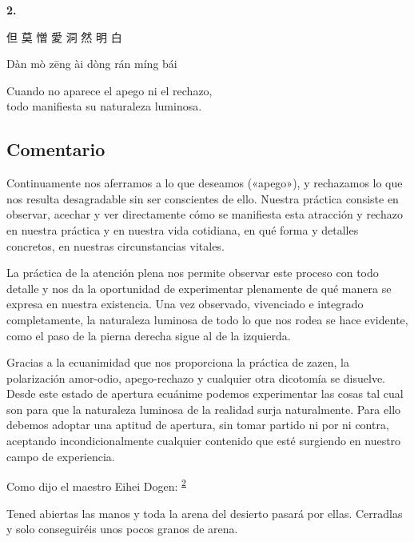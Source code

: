 \documentclass[
  a5paperpaper,
]{article}
\begin{document}
\hfill\break

\hypertarget{02}{}
\begin{verseblock}

\newpage

\begin{center}\textbf{2.}\end{center}

但 莫 憎 愛 洞 然 明 白

Dàn mò zēng ài dòng rán míng bái

Cuando no aparece el apego ni el rechazo,\\
todo manifiesta su naturaleza luminosa.

\end{verseblock}

\hfill\break

\hypertarget{comentario-1}{%
\subsection{Comentario}\label{comentario-1}}

Continuamente nos aferramos a lo que deseamos («apego»), y rechazamos lo
que nos resulta desagradable sin ser conscientes de ello. Nuestra
práctica consiste en observar, acechar y ver directamente cómo se
manifiesta esta atracción y rechazo en nuestra práctica y en nuestra
vida cotidiana, en qué forma y detalles concretos, en nuestras
circunstancias vitales.

La práctica de la atención plena nos permite observar este proceso con
todo detalle y nos da la oportunidad de experimentar plenamente de qué
manera se expresa en nuestra existencia. Una vez observado, vivenciado e
integrado completamente, la naturaleza luminosa de todo lo que nos rodea
se hace evidente, como el paso de la pierna derecha sigue al de la
izquierda.

Gracias a la ecuanimidad que nos proporciona la práctica de zazen, la
polarización amor-odio, apego-rechazo y cualquier otra dicotomía se
disuelve. Desde este estado de apertura ecuánime podemos experimentar
las cosas tal cual son para que la naturaleza luminosa de la realidad
surja naturalmente. Para ello debemos adoptar una aptitud de apertura,
sin tomar partido ni por ni contra, aceptando incondicionalmente
cualquier contenido que esté surgiendo en nuestro campo de experiencia.

Como dijo el maestro Eihei Dogen:
\textsuperscript{\protect\hypertarget{ref2}{\protect\hyperlink{nota2}{2}}}

Tened abiertas las manos y toda la arena del desierto pasará por ellas.
Cerradlas y solo conseguiréis unos pocos granos de arena.
\end{document}
